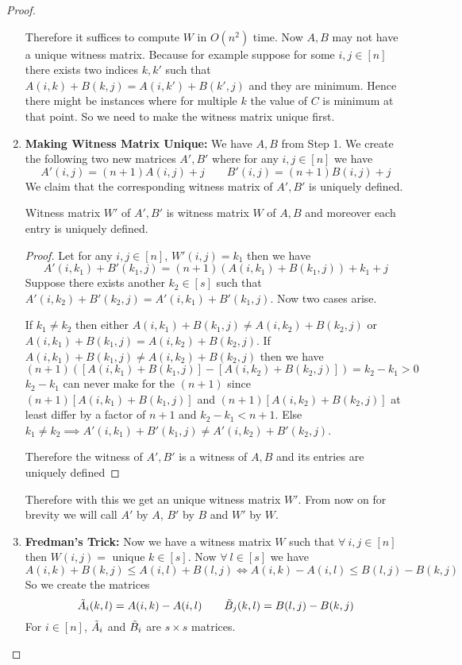 \begin{proof}
\begin{enumerate}[wide, label=\bfseries Step \arabic*,itemindent=0.5cm]
Therefore it suffices to compute $W$ in $O(n^2)$ time. Now $A,B$ may not have a unique witness matrix. Because for example suppose for some $i,j\in[n]$ there exists two indices $k,k'$ such that $A(i,k)+B(k,j)=A(i,k')+B(k',j)$ and they are minimum. Hence there might be instances where for multiple $k$ the value of $C$ is minimum at that point. So we need to make the witness matrix unique first.
\item \textbf{Making Witness Matrix Unique:} We have $A,B$ from Step 1. We create the following two new matrices $A',B'$ where for any $i,j\in[n]$ we have $$A'(i,j)=(n+1)A(i,j)+j\qquad B'(i,j)=(n+1)B(i,j)+j$$We claim that the corresponding witness matrix of $A',B'$ is uniquely defined.\parinn
\begin{claimwidth}
	\begin{Claim}{}{}
		Witness matrix $W'$ of $A',B'$ is witness matrix $W$ of $A,B$ and moreover each entry is uniquely defined.
	\end{Claim}
\begin{proof}
	Let for any $i,j\in[n]$, $W'(i,j)=k_1$ then we have $$A'(i,k_1)+B'(k_1,j)=(n+1)(A(i,k_1)+B(k_1,j))+k_1+j$$Suppose there exists another $k_2\in[s]$ such that $A'(i,k_2)+B'(k_2,j)=A'(i,k_1)+B'(k_1,j)$. Now two cases arise. \parinn
	
	If $k_1\neq k_2$ then either $A(i,k_1)+B(k_1,j)\neq A(i,k_2)+B(k_2,j)$ or $A(i,k_1)+B(k_1,j)= A(i,k_2)+B(k_2,j)$. If $A(i,k_1)+B(k_1,j)\neq A(i,k_2)+B(k_2,j)$ then we have $$(n+1)([A(i,k_1)+B(k_1,j)]-[A(i,k_2)+B(k_2,j)])=k_2-k_1>0$$ $k_2-k_1$ can never make for the $(n+1)$ since $(n+1)[A(i,k_1)+B(k_1,j)]$ and $(n+1)[ A(i,k_2)+B(k_2,j)]$ at least differ by a factor of $n+1$ and $k_2-k_1< n+1$. Else $k_1\neq k_2\implies A'(i,k_1)+B'(k_1,j)\neq A'(i,k_2)+B'(k_2,j)$.
	
	Therefore the witness of $A',B'$ is a witness of $A,B$ and its entries are uniquely defined
\end{proof}
\end{claimwidth}
Therefore with this we get an unique witness matrix $W'$. From now on for brevity we will call $A'$ by $A$, $B'$ by $B$ and $W'$ by $W$. 
\item \textbf{Fredman's Trick:} Now we have a witness matrix $W$ such that $\forall\ i,j\in[n]$ then $W(i,j)=$ unique $k\in[s]$. Now $\forall\ l\in [s]$ we have $$	A(i,k)+B(k,j) \leq A(i,l)+B(l,j)\iff A(i,k)-A(i,l)\leq B(l,j)-B(k,j)$$ So we create the matrices $$\tilde{A}_i(k,l)=A(i,k)-A(i,l)\qquad \tilde{B}_j(k,l)=B(l,j)-B(k,j)$$For $i\in[n]$, $\tilde{A}_i$ and $\tilde{B}_i$ are $s\times s$ matrices. 
	\end{enumerate}

\end{proof}